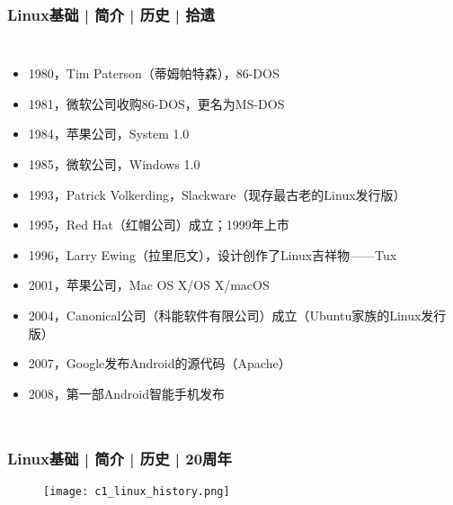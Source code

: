 \begin{frame}
  \frametitle{Linux基础 | 简介 | 历史 | 拾遗}
  \begin{columns}
  \begin{itemize}[<+->]
    \item 1980，Tim Paterson（蒂姆\textbullet 帕特森），86-DOS
    \item 1981，微软公司收购86-DOS，更名为MS-DOS
    \item 1984，苹果公司，System 1.0
    \item 1985，微软公司，Windows 1.0
    \item 1993，Patrick Volkerding，Slackware（现存最古老的Linux发行版）
    \item 1995，Red Hat（红帽公司）成立；1999年上市
    \item 1996，Larry Ewing（拉里\textbullet 厄文），设计创作了Linux吉祥物——\alert{Tux}
    \item 2001，苹果公司，Mac OS X/OS X/macOS
    \item 2004，Canonical公司（科能软件有限公司）成立（Ubuntu家族的Linux发行版）
    \item 2007，Google发布Android的源代码（Apache）
    \item 2008，第一部Android智能手机发布
  \end{itemize}
  \end{columns}
\end{frame}

\begin{frame}
  \frametitle{Linux基础 | 简介 | 历史 | 20周年}
  \begin{figure}
    \centering
    \texttt{[image: c1\_linux\_history.png]}
  \end{figure}
\end{frame}

